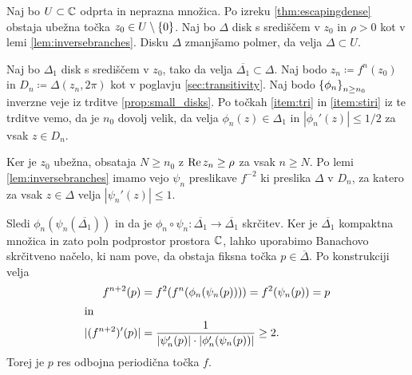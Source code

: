 \begin{dokaz}
    Naj bo \(U \subset \mathbb C\) odprta in neprazna množica. Po izreku \ref{thm:escapingdense} obstaja ubežna točka \(z_0 \in U \setminus \left\{ 0 \right\}\). Naj bo \(\Delta\) disk s središčem v \(z_0\) in \(\rho > 0\) kot v lemi \ref{lem:inversebranches}. Disku \(\Delta\) zmanjšamo polmer, da velja \(\Delta \subset U\).

    Naj bo \(\Delta_1\) disk s središčem v \(z_0\), tako da velja \(\overline{\Delta_1} \subset \Delta\). Naj bodo \(z_n \coloneq f^n (z_0)\) in \(D_n \coloneq \Delta (z_n, 2 \pi)\) kot v poglavju \ref{sec:transitivity}. Naj bodo \(\left\{ \phi_n \right\}_{n \geq n_0}\) inverzne veje iz trditve \ref{prop:small_disks}. Po točkah \ref{item:tri} in \ref{item:stiri} iz te trditve vemo, da je \(n_0\) dovolj velik, da velja \(\phi_n (z) \in \Delta_1\) in \(|\phi_n' (z)| \leq 1 / 2\) za vsak \(z \in D_n\).

    Ker je \(z_0\) ubežna, obsataja \(N \geq n_0\) z \(\operatorname{Re} z_n \geq \rho\) za vsak \(n \geq N\). Po lemi \ref{lem:inversebranches} imamo vejo \(\psi_n\) preslikave \(f^{-2}\) ki preslika \(\Delta\) v \(D_n\), za katero za vsak \(z \in \Delta\) velja \(|\psi_n' (z)| \leq 1\).

    Sledi \(\phi_n (\psi_n (\overline{\Delta_1}))\) in da je \(\phi_n \circ \psi_{n} \colon \overline{\Delta_1} \to \overline{\Delta_1}\) skrčitev. Ker je \(\overline{\Delta_1}\) kompaktna množica in zato poln podprostor prostora \(\mathbb C\), lahko uporabimo Banachovo skrčitveno načelo, ki nam pove, da obstaja fiksna točka \(p \in \overline{\Delta}\). Po konstrukciji velja
    \begin{align*}
        f^{n + 2} (p)      & = f^2 (f^n (\phi_n (\psi_n (p)))) = f^2 (\psi_n (p)) = p       \\
        \intertext{in}
        |(f^{n + 2})' (p)| & = \frac{1}{|\psi_n' (p)| \cdot |\phi_n' (\psi_n (p))|} \geq 2.
    \end{align*}
    Torej je \(p\) res odbojna periodična točka \(f\).
\end{dokaz}
